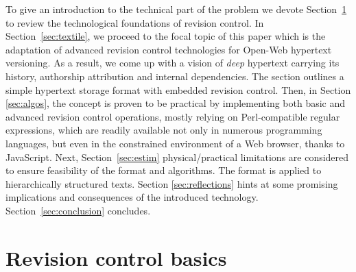 \documentclass{sig-alternate}
\begin{document}
To give an introduction to the technical part of the problem we devote Section~\ref{sec:scm} to review the technological foundations of revision control. 
In Section~\ref{sec:textile}, we proceed to the focal topic of this paper which is the adaptation of advanced revision control technologies for Open-Web hypertext versioning. As a result, we come up with a vision of \emph{deep} hypertext carrying its history, authorship attribution and internal dependencies.
The section outlines a simple hypertext storage format with embedded revision control.
Then, in Section \ref{sec:algos}, the concept is proven to be practical by implementing both basic and advanced revision control operations, mostly relying on Perl-compatible regular expressions, which are readily available not only in numerous programming languages, but even in the constrained environment of a Web browser, thanks to JavaScript.
Next, Section~\ref{sec:estim} physical/practical limitations are considered to ensure feasibility of the format and algorithms.
The format is applied to hierarchically structured texts.
Section \ref{sec:reflections} hints at some promising implications and consequences of the introduced technology.
Section~\ref{sec:conclusion} concludes.



\section{Revision control basics} \label{sec:scm}
\end{document}
